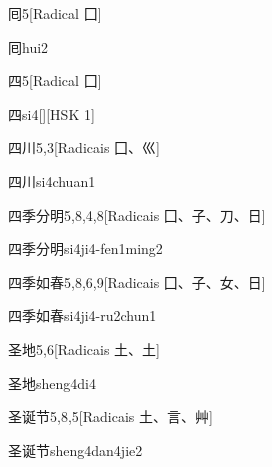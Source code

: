 \begin{entry}{囘}{5}[Radical ⼞]
  \begin{phonetics}{囘}{hui2}
  \end{phonetics}
\end{entry}

\begin{entry}{四}{5}[Radical ⼞]
  \begin{phonetics}{四}{si4}[][HSK 1]
  \end{phonetics}
\end{entry}

\begin{entry}{四川}{5,3}[Radicais ⼞、⼮]
  \begin{phonetics}{四川}{si4chuan1}
  \end{phonetics}
\end{entry}

\begin{entry}{四季分明}{5,8,4,8}[Radicais ⼞、⼦、⼑、⽇]
  \begin{phonetics}{四季分明}{si4ji4-fen1ming2}
  \end{phonetics}
\end{entry}

\begin{entry}{四季如春}{5,8,6,9}[Radicais ⼞、⼦、⼥、⽇]
  \begin{phonetics}{四季如春}{si4ji4-ru2chun1}
  \end{phonetics}
\end{entry}

\begin{entry}{圣地}{5,6}[Radicais ⼟、⼟]
  \begin{phonetics}{圣地}{sheng4di4}
  \end{phonetics}
\end{entry}

\begin{entry}{圣诞节}{5,8,5}[Radicais ⼟、⾔、⾋]
  \begin{phonetics}{圣诞节}{sheng4dan4jie2}
  \end{phonetics}
\end{entry}

